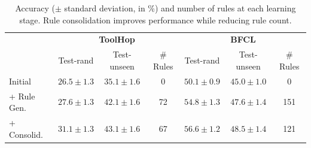 \documentclass[11pt]{article}
\begin{document}
\begin{table}[t]
\small
\caption{{Accuracy ($\pm$ standard deviation, in \%) and number of rules at each learning stage.} Rule consolidation improves performance while reducing rule count.}
\vspace{0.5em}
\label{tab:learning}
\centering
\renewcommand{\arraystretch}{1.25}
\begin{tabular}{@{}l|ccc|ccc@{}}
\toprule
 & \multicolumn{3}{c|}{\textbf{ToolHop}} & \multicolumn{3}{c}{\textbf{BFCL}} \\
 & Test-rand & Test-unseen & \# Rules & Test-rand & Test-unseen & \# Rules \\
\midrule
Initial
& $26.5 \scriptstyle \pm 1.3$ & $35.1 \scriptstyle \pm 1.6$ & 0
& $50.1 \scriptstyle \pm 0.9$ & $45.0 \scriptstyle \pm 1.0$ & 0 \\
+ Rule Gen.
& $27.6 \scriptstyle \pm 1.3$ & $42.1 \scriptstyle \pm 1.6$ & 72
& $54.8 \scriptstyle \pm 1.3$ & $47.6 \scriptstyle \pm 1.4$ & 151 \\
+ Consolid.
& $\mathbf{31.1} \scriptstyle \pm 1.3$ & $\mathbf{43.1} \scriptstyle \pm 1.6$ & 67
& $\mathbf{56.6} \scriptstyle \pm 1.2$ & $\mathbf{48.5} \scriptstyle \pm 1.4$ & 121
\\
\bottomrule
\end{tabular}
\end{table}

\end{document}

